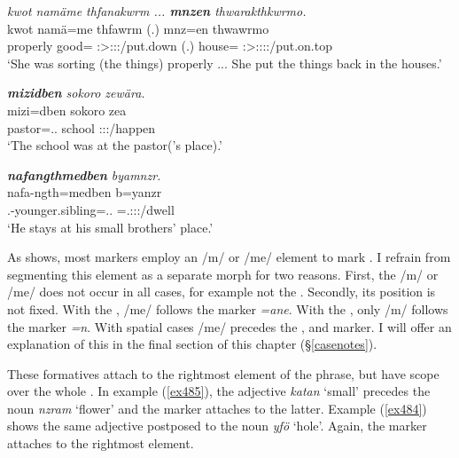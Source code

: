 \begin{exe}
	\ex \emph{kwot namäme thfanakwrm ... \textbf{mnzen} thwarakthkwrmo.}\\
	\gll kwot namä=me thfawrm (.) mnz=en thwawrmo\\
	properly good={\Ins} \Stsg:\Sbj>\Stpl:\Obj:\Pst:\Dur/put.down (.) house={\Loc} \Sg:\Sbj>\Stpl:\Io:\Pst:\Dur:\Andat/put.on.top\\ 
	\trans `She was sorting (the things) properly ... She put the things back in the houses.'
	\label{ex722}
\end{exe}
\newpage 
\begin{exe}
	\ex \emph{\textbf{mizidben} sokoro zewära.}\\
	\gll mizi=dben sokoro zea\\
	pastor=\Loc.\Anim.{\Sg} school \Sg:\Sbj:\Pst:\Pfv/happen\\
	\trans `The school was at the pastor('s place).'
	\label{ex723}
\end{exe}	
\begin{exe}
	\ex \emph{\textbf{nafangthmedben} byamnzr.}\\
	\gll nafa-ngth=medben b=yanzr\\
	\Third.\Poss-younger.sibling=\Loc.\Anim.{\Nsg} \Med=\Tsg.\Masc:\Sbj:\Nonpast:\Ipfv/dwell\\
	\trans `He stays at his small brothers' place.'
	\label{ex724}
\end{exe}
		 	
As  shows, most  markers employ an /m/ or /me/ element to mark  . I refrain from segmenting this element as a separate morph for two reasons. First, the /m/ or /me/ does not occur in all cases, for example not the  . Secondly, its position is not fixed. With the , /me/ follows the  marker \emph{=ane}. With the , only /m/ follows the  marker \emph{=n}. With spatial cases /me/ precedes the ,  and  marker. I will offer an explanation of this in the final section of this chapter ({\S}\ref{casenotes}).

These formatives attach to the rightmost element of the phrase, but have scope over the whole . In example (\ref{ex485}), the adjective \emph{katan} `small' precedes the noun \emph{nzram} `flower' and the  marker attaches to the latter. Example (\ref{ex484}) shows the same adjective postposed to the noun \emph{yfö} `hole'. Again, the  marker attaches to the rightmost element.

